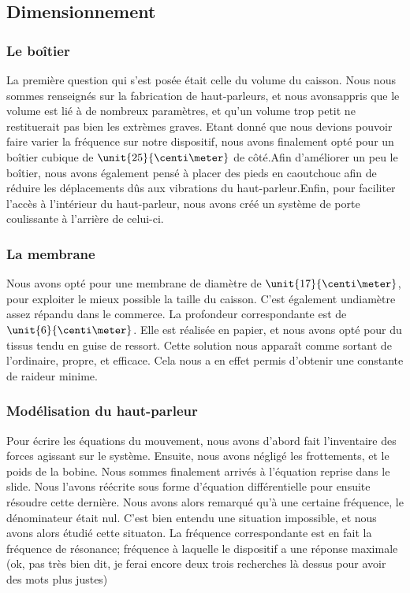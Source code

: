 \documentclass{article}
\begin{document}
\subsection{Dimensionnement}
\subsubsection{Le boîtier}
La première question qui s'est posée était celle du volume du caisson. Nous nous sommes renseignés sur la fabrication de 
haut-parleurs, et nous avonsappris que le volume est lié à de nombreux paramètres, et qu'un volume trop petit ne restituerait 
pas bien les extrèmes graves. Etant donné que nous devions pouvoir faire varier la fréquence sur notre dispositif, nous avons 
finalement opté pour un boîtier cubique de $\unit{25}{\centi\meter}$ de côté.Afin d'améliorer un peu le boîtier, nous avons
également pensé à placer des pieds en caoutchouc afin de réduire les déplacements dûs aux vibrations du haut-parleur.Enfin,
pour faciliter l'accès à l'intérieur du haut-parleur, nous avons créé un système de porte coulissante à l'arrière de celui-ci.

\subsubsection{La membrane}
Nous avons opté pour une membrane de diamètre de $\unit{17}{\centi\meter}$, pour exploiter le mieux possible la taille du
caisson. C'est également undiamètre assez répandu dans le commerce. La profondeur correspondante est de $\unit{6}{\centi\meter}$.
Elle est réalisée en papier, et nous avons opté pour du tissus tendu en guise de ressort. Cette solution nous apparaît comme
sortant de l'ordinaire, propre, et efficace. Cela nous a en effet permis d'obtenir une constante de raideur minime.

\subsubsection{Modélisation du haut-parleur}
Pour écrire les équations du mouvement, nous avons d'abord fait l'inventaire des forces agissant sur le système. Ensuite, nous
avons négligé les frottements, et le poids de la bobine. Nous sommes finalement arrivés à l'équation reprise dans le slide. 
Nous l'avons réécrite sous forme d'équation différentielle pour ensuite résoudre cette dernière. Nous avons alors remarqué 
qu'à une certaine fréquence, le dénominateur était nul. C'est bien entendu une situation impossible, et nous avons alors
étudié cette situaton. La fréquence correspondante est en fait la fréquence de résonance; fréquence à laquelle le dispositif a
une réponse maximale (ok, pas très bien dit, je ferai encore deux trois recherches là dessus pour avoir des mots plus justes)
\end{document}
